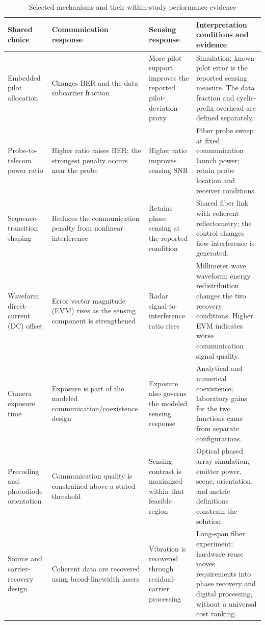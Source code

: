 \begin{table}[t]
\caption{Selected mechanisms and their within-study performance evidence}
\label{tab:metric_admissibility}
\centering
\footnotesize
\setlength{\tabcolsep}{4pt}
\renewcommand{\arraystretch}{1.12}
\begin{tabularx}{\textwidth}{@{}>{\raggedright\arraybackslash}p{}
>{\raggedright\arraybackslash}p{}
>{\raggedright\arraybackslash}p{}
>{\raggedright\arraybackslash}X@{}}
\toprule
Shared choice & Communication response & Sensing response & Interpretation
conditions and evidence \\
\midrule
Embedded pilot allocation \cite{OISAC_SCR00007} & Changes BER and the data
subcarrier fraction & More pilot support improves the reported pilot-deviation
proxy & Simulation; known-pilot error is the reported sensing measure. The
data fraction and cyclic-prefix overhead are defined separately. \\
Probe-to-telecom power ratio \cite{OISAC_SCR00057} & Higher ratio raises BER;
the strongest penalty occurs near the probe & Higher ratio improves sensing
SNR & Fiber probe sweep at fixed communication launch power; retain probe
location and receiver conditions. \\
Sequence-transition shaping \cite{OISAC_SCR00052} & Reduces the communication
penalty from nonlinear interference & Retains phase sensing at the reported
condition & Shared fiber link with coherent reflectometry; the control changes
how interference is generated. \\
Waveform direct-current (DC) offset \cite{OISAC_SCR00808} & Error vector
magnitude (EVM) rises as the sensing component
is strengthened & Radar signal-to-interference ratio rises & Millimeter wave
waveform; energy redistribution changes the two recovery conditions. Higher
EVM indicates worse communication signal quality. \\
Camera exposure time \cite{OISAC_SCR00273} & Exposure is part of the modeled
communication/coexistence design & Exposure also governs the modeled sensing
response & Analytical and numerical coexistence; laboratory gains for the two
functions came from separate configurations. \\
Precoding and photodiode orientation \cite{OISAC_SCR00940} & Communication
quality is constrained above a stated threshold & Sensing contrast is
maximized within that feasible region & Optical phased array simulation;
emitter power, scene, orientation, and metric definitions constrain the
solution. \\
Source and carrier-recovery design \cite{OISAC_SCR01070} & Coherent data are
recovered using broad-linewidth lasers & Vibration is recovered through
residual-carrier processing & Long-span fiber experiment; hardware reuse moves
requirements into phase recovery and digital processing, without a universal
cost ranking. \\
\bottomrule
\end{tabularx}
\end{table}

